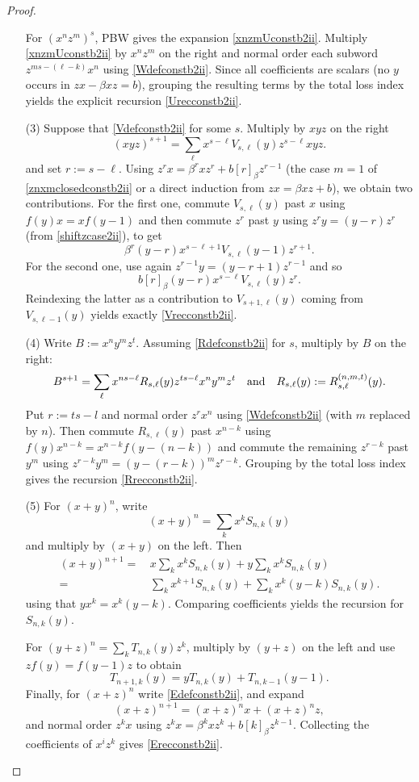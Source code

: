 \documentclass{amsart}
\theoremstyle{definition}
\theoremstyle{remark}
\numberwithin{equation}{section}
\begin{document}
\begin{proof}
\begin{enumerate}
For $(x^n z^m)^s$, PBW gives the expansion \eqref{xnzmUconstb2ii}. Multiply \eqref{xnzmUconstb2ii} by $x^n z^m$ on the right and normal order each subword $z^{ms-(\ell-k)}x^n$ using \eqref{Wdefconstb2ii}. Since all coefficients are scalars (no $y$ occurs in $zx - \beta xz = b$), grouping the resulting terms by the total loss index yields the explicit recursion \eqref{Urecconstb2ii}.

\item [\rm (3)] Suppose that \eqref{Vdefconstb2ii} for some $s$. Multiply by $xyz$ on the right
\[
(xyz)^{s+1} = \sum_{\ell} x^{s-\ell}V_{s,\ell}(y)z^{s-\ell}xyz.
\]
and set $r:=s-\ell$. Using $z^{r}x=\beta^{r}x z^{r}+b[r]_\beta z^{r-1}$ (the case $m=1$ of \eqref{znxmclosedconstb2ii} or a direct induction from $zx=\beta xz+b$), we obtain two contributions.
For the first one, commute $V_{s,\ell}(y)$ past $x$ using $f(y)x=x f(y-1)$ and then commute $z^r$ past $y$ using
$z^r y=(y-r)z^r$ (from \eqref{shiftzcase2ii}), to get
\[
\beta^{r}(y-r)  x^{s-\ell+1}V_{s,\ell}(y-1)z^{r+1}.
\]
For the second one, use again $z^{r-1}y=(y-r+1)z^{r-1}$ and so 
\[
b[r]_\beta (y-r)x^{s-\ell}V_{s,\ell}(y)z^{r}.
\]
Reindexing the latter as a contribution to $V_{s+1,\ell}(y)$ coming from $V_{s,\ell-1}(y)$ yields exactly \eqref{Vrecconstb2ii}.

\item [\rm (4)] Write $B:=x^n y^m z^t$. Assuming \eqref{Rdefconstb2ii} for $s$, multiply by $B$ on the right:
\[
B^{s+1}=\sum_{\ell} x^{ns-\ell}R_{s,\ell}(y)  z^{ts-\ell}x^n y^m z^t 
\quad {\rm and} \quad R_{s,\ell}(y):=R^{(n,m,t)}_{s,\ell}(y).
\]
Put $r := ts - l$ and normal order $z^{r}x^n$ using \eqref{Wdefconstb2ii} (with $m$ replaced by $n$). Then commute $R_{s,\ell}(y)$ past $x^{n-k}$ using $f(y)x^{n-k}=x^{n-k}f(y-(n-k))$ and commute the remaining
$z^{r-k}$ past $y^m$ using $z^{r-k}y^m=(y-(r-k))^m z^{r-k}$. Grouping by the total loss index gives the recursion \eqref{Rrecconstb2ii}.

\item [\rm (5)] For $(x+y)^n$, write
$$
(x+y)^n = \sum_k x^k S_{n,k}(y)
$$ 
and multiply by $(x+y)$ on the left. Then
\begin{align*}
(x+y)^{n+1} = &\, x\sum_k x^k S_{n,k}(y)+y\sum_k x^k S_{n,k}(y) \\
= &\, \sum_k x^{k+1}S_{n,k}(y)+\sum_k x^k (y-k)S_{n,k}(y).
\end{align*}
using that $yx^k = x^k(y-k)$. Comparing coefficients yields the recursion for $S_{n,k}(y)$. 

For $(y+z)^n = \sum_k T_{n,k}(y)z^k$, multiply by $(y+z)$ on the left and use $z f(y)=f(y-1)z$ to obtain 
$$
T_{n+1,k}(y)=yT_{n,k}(y)+T_{n,k-1}(y-1).
$$
Finally, for $(x+z)^n$ write \eqref{Edefconstb2ii}, and expand
\[
(x+z)^{n+1}=(x+z)^n x+(x+z)^n z,
\]
and normal order $z^k x$ using $z^k x=\beta^k x z^k+b[k]_\beta z^{k-1}$. Collecting the coefficients of $x^i z^k$ gives \eqref{Erecconstb2ii}.
\end{enumerate}
\end{proof}
\end{document}
